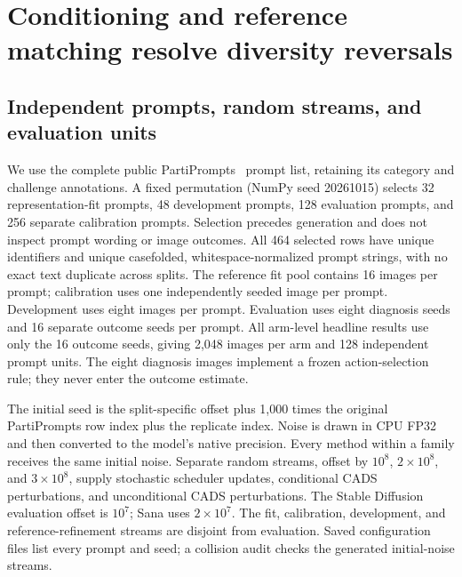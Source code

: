 \section{Conditioning and reference matching resolve diversity reversals}
\label{sec:supp_t2i}

\subsection{Independent prompts, random streams, and evaluation units}
We use the complete public PartiPrompts~\cite{yu2022parti} prompt list, retaining its category and
challenge annotations. A fixed permutation (NumPy seed 20261015) selects 32
representation-fit prompts, 48 development prompts, 128 evaluation prompts, and
256 separate calibration prompts. Selection precedes generation and does not
inspect prompt wording or image outcomes. All 464 selected rows have unique
identifiers and unique casefolded, whitespace-normalized prompt strings, with
no exact text duplicate across splits. The reference fit pool contains 16
images per prompt; calibration uses one independently seeded image per prompt.
Development uses eight images per prompt. Evaluation uses eight diagnosis seeds
and 16 separate outcome seeds per prompt. All arm-level headline results use
only the 16 outcome seeds, giving 2,048 images per arm and 128 independent prompt
units. The eight diagnosis images implement a frozen action-selection rule;
they never enter the outcome estimate.

The initial seed is the split-specific offset plus 1,000 times the original
PartiPrompts row index plus the replicate index. Noise is drawn in CPU FP32 and
then converted to the model's native precision. Every method within a family
receives the same initial noise. Separate random streams, offset by $10^8$,
$2\!\times\!10^8$, and $3\!\times\!10^8$, supply stochastic scheduler updates,
conditional CADS perturbations, and unconditional CADS perturbations. The
Stable Diffusion evaluation offset is $10^7$; Sana uses $2\!\times\!10^7$.
The fit, calibration, development, and reference-refinement streams are disjoint
from evaluation. Saved configuration files list every prompt and seed; a
collision audit checks the generated initial-noise streams.

